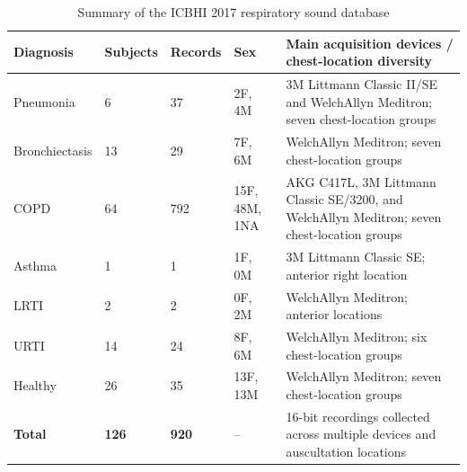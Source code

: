 \begin{table}[!t]
\centering
\caption{Summary of the ICBHI 2017 respiratory sound database}
\label{tab:icbhi_demographics}
\footnotesize
\setlength{\tabcolsep}{3pt}
\renewcommand{\arraystretch}{1.12}
\begin{tabularx}{\textwidth}{@{}p{2.2cm}p{1.4cm}p{1.5cm}p{2.0cm}X@{}}
\toprule
\textbf{Diagnosis} & \textbf{Subjects} & \textbf{Records} & \textbf{Sex} & \textbf{Main acquisition devices / chest-location diversity} \\
\midrule
Pneumonia & 6 & 37 & 2F, 4M & 3M Littmann Classic II/SE and WelchAllyn Meditron; seven chest-location groups \\
Bronchiectasis & 13 & 29 & 7F, 6M & WelchAllyn Meditron; seven chest-location groups \\
COPD & 64 & 792 & 15F, 48M, 1NA & AKG C417L, 3M Littmann Classic SE/3200, and WelchAllyn Meditron; seven chest-location groups \\
Asthma & 1 & 1 & 1F, 0M & 3M Littmann Classic SE; anterior right location \\
LRTI & 2 & 2 & 0F, 2M & WelchAllyn Meditron; anterior locations \\
URTI & 14 & 24 & 8F, 6M & WelchAllyn Meditron; six chest-location groups \\
Healthy & 26 & 35 & 13F, 13M & WelchAllyn Meditron; seven chest-location groups \\
\midrule
\textbf{Total} & \textbf{126} & \textbf{920} & -- & 16-bit recordings collected across multiple devices and auscultation locations \\
\bottomrule
\end{tabularx}
\end{table}
